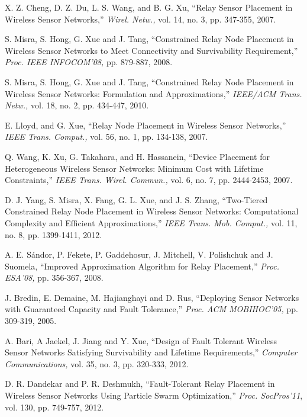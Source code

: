 \documentclass[journal]{IEEEtran}
\begin{document}
\begin{thebibliography}{1}
 X. Z. Cheng, D. Z. Du, L. S. Wang, and B. G. Xu, ``Relay Sensor Placement in Wireless Sensor Networks,''
 {\it Wirel. Netw.,} vol. 14, no. 3, pp. 347-355, 2007.

S. Misra, S. Hong, G. Xue and J. Tang, ``Constrained Relay Node Placement in Wireless Sensor Networks to
Meet Connectivity and Survivability Requirement,'' {\it Proc. IEEE INFOCOM'08,} pp. 879-887, 2008.

S. Misra, S. Hong, G. Xue and J. Tang, ``Constrained Relay Node Placement in Wireless Sensor Networks:
Formulation and Approximations,'' {\it IEEE/ACM Trans. Netw.,} vol. 18, no. 2, pp. 434-447, 2010.

 E. Lloyd, and G. Xue, ``Relay Node Placement in Wireless Sensor Networks,'' {\it IEEE Trans. Comput.,} vol. 56,
 no. 1, pp. 134-138, 2007.

Q. Wang, K. Xu, G. Takahara, and H. Hassanein, ``Device Placement for Heterogeneous Wireless Sensor Networks:
Minimum Cost with Lifetime Constraints,'' {\it IEEE Trans. Wirel. Commun.,} vol. 6, no. 7, pp. 2444-2453, 2007.

 D. J. Yang, S. Misra, X. Fang, G. L. Xue, and J. S. Zhang, ``Two-Tiered Constrained Relay Node Placement in Wireless
 Sensor Networks: Computational Complexity and Efficient Approximations,'' {\it IEEE Trans. Mob. Comput.,}
 vol. 11, no. 8, pp. 1399-1411, 2012.

 A. E. S\'{a}ndor, P. Fekete, P. Gaddehosur, J. Mitchell, V. Polishchuk and J. Suomela, ``Improved Approximation Algorithm for Relay
 Placement,'' {\it Proc. ESA'08,} pp. 356-367, 2008.

 J. Bredin, E. Demaine, M. Hajianghayi and D. Rus, ``Deploying Sensor Networks with Guaranteed Capacity and Fault Tolerance,''
 {\it Proc. ACM MOBIHOC'05,} pp. 309-319, 2005.

 A. Bari, A Jaekel, J. Jiang and Y. Xue, ``Design of Fault Tolerant Wireless Sensor Networks Satisfying Survivability and Lifetime
 Requirements,'' {\it Computer Communications,} vol. 35, no. 3, pp. 320-333, 2012.

 D. R. Dandekar and P. R. Deshmukh, ``Fault-Tolerant Relay Placement in Wireless Sensor Networks Using Particle Swarm Optimization,''
 {\it Proc. SocPros'11}, vol. 130, pp. 749-757, 2012.

\end{thebibliography}
\end{document}
